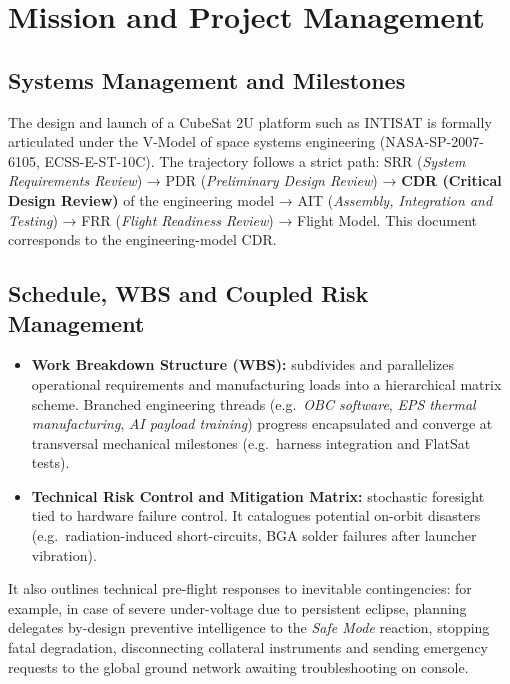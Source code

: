 \chapter{Mission and Project Management}

\section{Systems Management and Milestones}
The design and launch of a CubeSat 2U platform such as INTISAT is formally articulated under the V-Model of space systems engineering (NASA-SP-2007-6105, ECSS-E-ST-10C). The trajectory follows a strict path: SRR (\textit{System Requirements Review}) → PDR (\textit{Preliminary Design Review}) → \textbf{CDR (Critical Design Review)} of the engineering model → AIT (\textit{Assembly, Integration and Testing}) → FRR (\textit{Flight Readiness Review}) → Flight Model. This document corresponds to the engineering-model CDR.

\section{Schedule, WBS and Coupled Risk Management}
\begin{itemize}
    \item \textbf{Work Breakdown Structure (WBS):} subdivides and parallelizes operational requirements and manufacturing loads into a hierarchical matrix scheme. Branched engineering threads (e.g.\ \textit{OBC software}, \textit{EPS thermal manufacturing}, \textit{AI payload training}) progress encapsulated and converge at transversal mechanical milestones (e.g.\ harness integration and FlatSat tests).

    \item \textbf{Technical Risk Control and Mitigation Matrix:} stochastic foresight tied to hardware failure control. It catalogues potential on-orbit disasters (e.g.\ radiation-induced short-circuits, BGA solder failures after launcher vibration).
\end{itemize}

It also outlines technical pre-flight responses to inevitable contingencies: for example, in case of severe under-voltage due to persistent eclipse, planning delegates by-design preventive intelligence to the \textit{Safe Mode} reaction, stopping fatal degradation, disconnecting collateral instruments and sending emergency requests to the global ground network awaiting troubleshooting on console.
